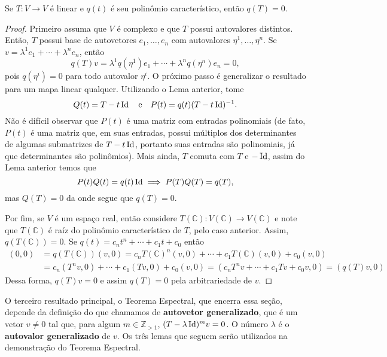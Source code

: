 \begin{theorem}
    Se $T \colon V \to V$ é linear e $q(t)$ é seu polinômio característico, então $q(T) = 0$.
\end{theorem}
\begin{proof}
    Primeiro assuma que $V$ é complexo e que $T$ possui autovalores distintos. Então, $T$ possui base de autovetores $e_1, \dots, e_n$ com autovalores $\eta^1, \dots, \eta^n$. Se $v = \lambda^1 e_1 + \cdots + \lambda^n e_n$, então \begin{equation}
        q(T)v = \lambda^1 q(\eta^1) e_1 + \cdots + \lambda^n q(\eta^n) e_n = 0,
    \end{equation} pois $q(\eta^i) = 0$ para todo autovalor $\eta^i$. O próximo passo é generalizar o resultado para um mapa linear qualquer. Utilizando o Lema anterior, tome \begin{equation}
        Q(t) = T - t\operatorname{Id} \quad \text{e} \quad P(t) = q(t) (T - t\operatorname{Id})^{-1}.
    \end{equation} Não é difícil observar que $P(t)$ é uma matriz com entradas polinomiais (de fato, $P(t)$ é uma matriz que, em suas entradas, possui múltiplos dos determinantes de algumas submatrizes de $T - t\operatorname{Id}$, portanto suas entradas são polinomiais, já que determinantes são polinômios). Mais ainda, $T$ comuta com $T$ e $-\operatorname{Id}$, assim do Lema anterior temos que \begin{equation}
        P(t)Q(t) = q(t)\operatorname{Id} \implies P(T)Q(T) = q(T),
    \end{equation} mas $Q(T) = 0$ da onde segue que $q(T) = 0$.

    Por fim, se $V$ é um espaço real, então considere $T(\mathbb{C}) \colon V(\mathbb{C}) \to V(\mathbb{C})$ e note que $T(\mathbb{C})$ é raíz do polinômio característico de $T$, pelo caso anterior. Assim, $q(T(\mathbb{C})) = 0$. Se $q(t) = c_n t^n + \cdots + c_1 t + c_0$ então \begin{align}
        (0,0) &= q(T(\mathbb{C}))(v,0) = c_n T(\mathbb{C})^n(v,0) + \cdots + c_1 T(\mathbb{C})(v,0) + c_0(v,0) \\ &= c_n(T^nv,0) + \cdots + c_1(Tv,0) + c_0(v,0) = (c_n T^n v + \cdots + c_1 Tv + c_0v, 0) = (q(T)v,0)
    \end{align} Dessa forma, $q(T)v = 0$ e assim $q(T) = 0$ pela arbitrariedade de $v$.
\end{proof}

O terceiro resultado principal, o Teorema Espectral, que encerra essa seção, depende da definição do que chamamos de \textbf{autovetor generalizado}, que é um vetor $v \neq 0$ tal que, para algum $m \in \mathbb{Z}_{>1}$, $(T - \lambda\operatorname{Id})^m v = 0$. O número $\lambda$ é o \textbf{autovalor generalizado} de $v$. Os três lemas que seguem serão utilizados na demonstração do Teorema Espectral.

